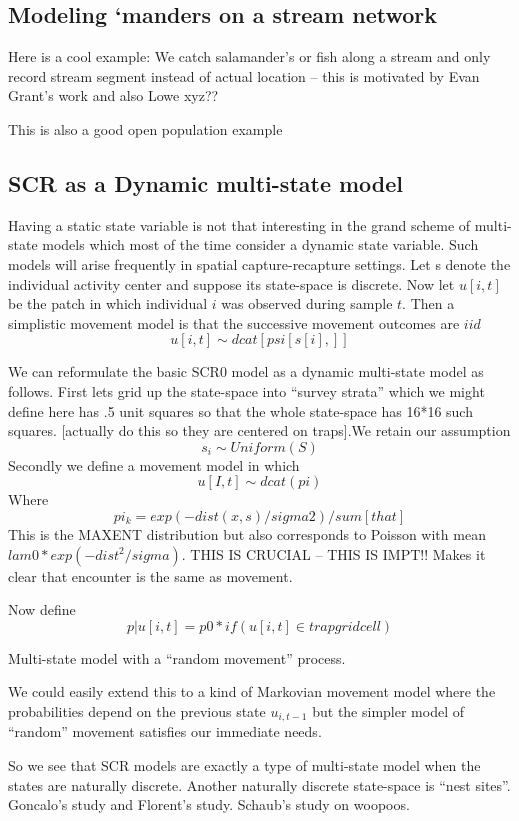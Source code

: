 {\subsection{Modeling ‘manders on a stream network}

Here is a cool example: We catch salamander’s or fish along a stream
and only record stream segment instead of actual location – this is
motivated by Evan Grant’s work and also Lowe xyz??

This is also a good open population example

\subsection{SCR as a Dynamic multi-state model}

Having a static state variable is not that interesting in the grand
scheme of multi-state models which most of the time consider a dynamic
state variable. Such models will arise frequently in spatial
capture-recapture settings. Let s denote the individual activity
center and suppose its state-space is discrete.  Now let $u[i,t]$ be
the patch in which individual $i$ was observed during sample $t$. Then
a simplistic movement model is that the successive movement outcomes
are $iid$
\[
u[i,t] \sim  dcat[ psi[s[i],] ]
\]

We can reformulate the basic SCR0 model as a dynamic multi-state model
as follows.  First lets grid up the state-space into “survey strata”
which we might define here has .5 unit squares so that the whole
state-space has 16*16 such squares. [actually do this so they are
centered on traps].We retain our assumption
\[
 s_{i} \sim Uniform(S)
\]
Secondly we define a movement model in which
\[
u[I,t] \sim dcat(pi)
\]
Where
\[
 pi_{k} = exp(-dist(x,s)/sigma2)/sum[that]
\]
This is the MAXENT distribution but also corresponds to Poisson with
mean $lam0*exp(-dist^2/sigma)$.  THIS IS CRUCIAL – THIS IS IMPT!!
 Makes it clear that encounter is the same as movement.

Now define
\[
 p|u[i,t] = p0*if(u[i,t] \in trap grid cell)
\]

Multi-state model with a “random movement” process.


We could easily extend this to a kind of Markovian movement model
where the probabilities depend on the previous state $u_{i,t-1}$ but
the simpler model of ``random'' movement satisfies our immediate needs.
 
So we see that SCR models are exactly a type of multi-state model when
the states are naturally discrete.  Another naturally discrete
state-space is ``nest sites''. Goncalo’s study and Florent’s
study. Schaub’s study on woopoos.


}
